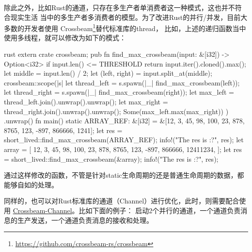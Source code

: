 除此之外，比如Rust的通道，只存在多生产者单消费者这一种模式，这也并不符合现实生活
当中的多生产者多消费者的模型。为了改进Rust的并行/并发，目前大多数的开发者使用
Crossbeam\footnote{\url{https://github.com/crossbeam-rs/crossbeam}}替代标准库的thread，
比如，上述的递归函数当中使用多线程，就可以修改为如下的模式：
\begin{code-block}{rust}
extern crate crossbeam;
pub fn find_max_crossbeam(input: &[i32]) -> Option<i32> {
    if input.len() <= THRESHOLD {
        return input.iter().cloned().max();
    }
    let middle = input.len() / 2;
    let (left, right) = input.split_at(middle);
    crossbeam::scope(|s| {
        let thread_left = s.spawn(|_| find_max_crossbeam(left));
        let thread_right = s.spawn(|_| find_max_crossbeam(right));
        let max_left = thread_left.join().unwrap().unwrap();
        let max_right = thread_right.join().unwrap().unwrap();
        Some(max_left.max(max_right))
    })
    .unwrap()
}
fn main() {
    static ARRAY_REF: &[i32] = &[12, 3, 45, 98, 100, 23, 878, 8765, 123, -897, 866666, 1241];
    let res = short_lived::find_max_crossbeam(ARRAY_REF);
    info!("The res is {:?}", res);
    let array = [
        12, 3, 45, 98, 100, 23, 878, 8765, 123, -897, 866666, 12411234,
    ];
    let res = short_lived::find_max_crossbeam(&array);
    info!("The res is {:?}", res);
}
\end{code-block}
通过这样修改的函数，不管是针对static生命周期的还是普通生命周期的数据，都能够自如的处理。

同样的，也可以对Rust标准库的通道（Channel）进行优化，此时，则需要配合使用
\href{https://github.com/crossbeam-rs/crossbeam}{Crossbeam-Channel}。比如下面的例子：
启动2个并行的通道，一个通道负责消息的生产发送，一个通道负责消息的接收和处理。



